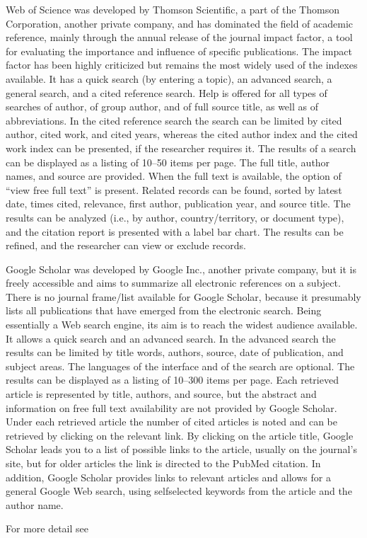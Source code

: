 \begin{enumerate}
	Web of Science was developed by Thomson Scientific, a part of the Thomson Corporation, another private company, and has dominated the field of academic reference, mainly through the annual release of the journal impact factor, a tool for evaluating the importance and influence of specific publications. The impact factor has been highly criticized but remains the most widely used of the indexes available. It has a quick search (by entering a topic), an advanced search, a general search, and a cited reference search. Help is offered for all types of searches of author, of group author, and of full source title, as well as of abbreviations. In the cited reference search the search can be limited by cited author, cited work, and cited years, whereas the cited author index and the cited work index can be presented, if the researcher requires it. The results of a search can be displayed as a listing of 10–50 items per page. The full title, author names, and source are provided. When the full text is available, the option of “view free full text” is present. Related records
	can be found, sorted by latest date, times cited, relevance, first author, publication year, and source title. The results can be analyzed (i.e., by author, country/territory, or document type), and the citation report is
	presented with a label bar chart. The results can be refined, and the researcher can view or exclude records.
	
	Google Scholar was developed by Google Inc., another private company, but it is freely accessible and aims to summarize all electronic references on a subject. There is no journal frame/list available for Google Scholar, because it presumably lists all publications that 	have emerged from the electronic search. Being essentially a Web search engine, its aim is to reach the widest
	audience available. It allows a quick search and an advanced search. In the advanced search the results can be limited by title words, authors, source, date of publication, and subject areas. The languages of the interface and of the search are optional. The results can be displayed as a listing of 10–300 items per page. Each retrieved article is represented by title, authors, and
	source, but the abstract and information on free full text availability are not provided by Google Scholar. Under each retrieved article the number of cited
	articles is noted and can be retrieved by clicking on the relevant link. By clicking on the article title, Google Scholar leads you to a list of possible links to the article, usually on the journal’s site, but for older articles the
	link is directed to the PubMed citation. In addition, Google Scholar provides links to relevant articles and 	allows for a general Google Web search, using selfselected keywords from the article and the author name.
	
	For more detail see \cite{Matthew2008}
\end{enumerate}

